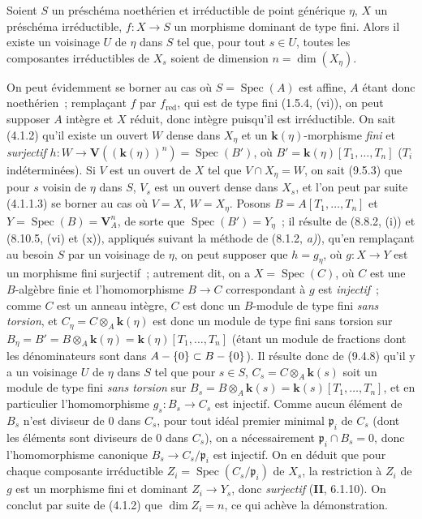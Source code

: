 \begin{corollary}[9.5.6]
\label{IV.9.5.6-fr}
Soient $S$ un préschéma noethérien et irréductible de point générique $\eta$,
$X$ un préschéma irréductible, $f:X\to S$ un morphisme dominant de type fini.
Alors il existe un voisinage $U$ de $\eta$ dans $S$ tel que, pour tout
$s\in U$, toutes les composantes irréductibles de $X_s$ soient de dimension
$n=\dim(X_\eta)$.
\end{corollary}

On peut évidemment se borner au cas où $S=\operatorname{Spec}(A)$ est affine,
$A$ étant donc noethérien~; remplaçant $f$ par $f_{\mathrm{red}}$, qui est de
type fini (1.5.4, (vi)), on peut
supposer $A$ intègre et $X$ réduit, donc intègre puisqu'il est irréductible. On
sait (4.1.2) qu'il existe un ouvert $W$ dense dans $X_\eta$ et un
$\boldsymbol{k}(\eta)$-morphisme \emph{fini} et \emph{surjectif}
$h:W\to\mathbf V((\boldsymbol{k}(\eta))^n)=\operatorname{Spec}(B')$, où
$B'=\boldsymbol{k}(\eta)[T_1,\ldots,T_n]$ ($T_i$ indéterminées). Si $V$ est un ouvert de
$X$ tel que $V\cap X_\eta=W$, on sait (9.5.3) que pour $s$ voisin de $\eta$
dans $S$, $V_s$ est un ouvert dense dans $X_s$, et l'on peut par suite (4.1.1.3)
se borner au cas où $V=X$, $W=X_\eta$. Posons
$B=A[T_1,\ldots,T_n]$ et $Y=\operatorname{Spec}(B)=\mathbf V_A^n$, de sorte
que $\operatorname{Spec}(B')=Y_\eta$~; il résulte de (8.8.2, (i)) et
(8.10.5, (vi) et (x)), appliqués suivant la méthode de (8.1.2, \emph{a)}),
qu'en remplaçant au besoin $S$ par un voisinage de $\eta$, on peut supposer que
$h=g_\eta$, où $g:X\to Y$ est un morphisme fini surjectif~; autrement dit, on
a $X=\operatorname{Spec}(C)$, où $C$ est une $B$-algèbre finie et
l'homomorphisme $B\to C$ correspondant à $g$ est \emph{injectif}~; comme $C$
est un anneau intègre, $C$ est donc un $B$-module de type fini \emph{sans
torsion}, et $C_\eta=C\otimes_A \boldsymbol{k}(\eta)$ est donc un module de type fini sans
torsion sur $B_\eta=B'=B\otimes_A \boldsymbol{k}(\eta)=\boldsymbol{k}(\eta)[T_1,\ldots,T_n]$ (étant un
module de fractions dont les dénominateurs sont dans
$A-\{0\}\subset B-\{0\}$). Il résulte donc de (9.4.8) qu'il y a un voisinage
$U$ de $\eta$ dans $S$ tel que pour $s\in S$,
$C_s=C\otimes_A \boldsymbol{k}(s)$ soit un module de type fini \emph{sans torsion} sur
$B_s=B\otimes_A \boldsymbol{k}(s)=\boldsymbol{k}(s)[T_1,\ldots,T_n]$, et en particulier l'homomorphisme
$g_s:B_s\to C_s$ est injectif. Comme aucun élément de $B_s$ n'est diviseur de
0 dans $C_s$, pour tout idéal premier minimal $\mathfrak p_i$ de $C_s$ (dont
les éléments sont diviseurs de 0 dans $C_s$), on a nécessairement
$\mathfrak p_i\cap B_s=0$, donc l'homomorphisme canonique
$B_s\to C_s/\mathfrak p_i$ est injectif. On en déduit que pour chaque
composante irréductible $Z_i=\operatorname{Spec}(C_s/\mathfrak p_i)$ de $X_s$,
la restriction à $Z_i$ de $g$ est un morphisme fini et dominant $Z_i\to Y_s$,
donc \emph{surjectif} (\textbf{II}, 6.1.10). On conclut par suite de (4.1.2)
que $\dim Z_i=n$, ce qui achève la démonstration.

